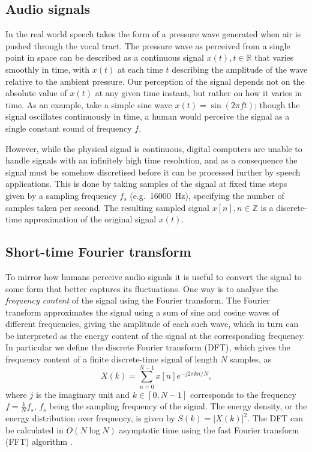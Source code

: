 \subsection{Audio signals}

In the real world speech takes the form of a pressure wave generated when air is pushed through the vocal tract.
The pressure wave as perceived from a single point in space can be described as a continuous signal $x(t), t\in \mathbb{R}$ that varies smoothly in time, with $x(t)$ at each time $t$ describing the amplitude of the wave relative to the ambient pressure.
Our perception of the signal depends not on the absolute value of $x(t)$ at any given time instant, but rather on how it varies in time.
As an example, take a simple sine wave $x(t) = \sin(2\pi f t)$; though the signal oscillates continuously in time, a human would perceive the signal as a single constant sound of frequency $f$.

However, while the physical signal is continuous, digital computers are unable to handle signals with an infinitely high time resolution, and as a consequence the signal must be somehow discretised before it can be processed further by speech applications.
This is done by taking samples of the signal at fixed time steps given by a sampling frequency $f_s$ (e.g.\ \SI{16000}{\Hz}), specifying the number of samples taken per second.
The resulting sampled signal $x[n], n \in \mathbb{Z}$ is a discrete-time approximation of the original signal $x(t)$.

\subsection{Short-time Fourier transform}

To mirror how humans perceive audio signals it is useful to convert the signal to some form that better captures its fluctuations.
One way is to analyse the \emph{frequency content} of the signal using the Fourier transform.
The Fourier transform approximates the signal using a sum of sine and cosine waves of different frequencies, giving the amplitude of each such wave, which in turn can be interpreted as the energy content of the signal at the corresponding frequency.
In particular we define the discrete Fourier transform (DFT), which gives the frequency content of a finite discrete-time signal of length $N$ samples, as
\begin{equation}
X(k) = \sum_{n=0}^{N-1} x[n]e^{-j2\pi kn/N},
\end{equation}
where $j$ is the imaginary unit and $k \in [0, N-1]$ corresponds to the frequency $f = \frac{k}{N}f_s$, $f_s$ being the sampling frequency of the signal.
The energy density, or the energy distribution over frequency, is given by $S(k) = \left|X(k)\right|^2$.
The DFT can be calculated in $O(N \log N)$ asymptotic time using the fast Fourier transform (FFT) algorithm \parencite{cooley1965algorithm}.

